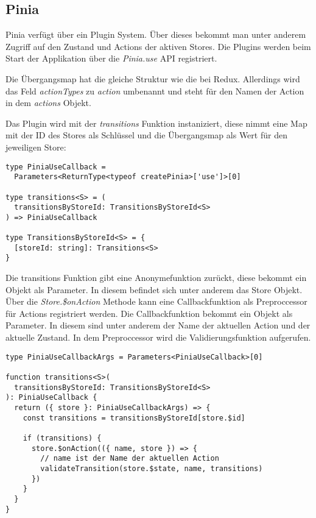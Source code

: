 \subsection{Pinia}

Pinia verfügt über ein Plugin System. Über dieses bekommt man unter anderem Zugriff auf den Zustand und Actions der aktiven Stores. Die Plugins werden beim Start der Applikation über die \textit{Pinia.use} API registriert.

Die Übergangsmap hat die gleiche Struktur wie die bei Redux. Allerdings wird das Feld \textit{actionTypes} zu \textit{action} umbenannt und steht für den Namen der Action in dem \textit{actions} Objekt. 

Das Plugin wird mit der \textit{transitions} Funktion instaniziert, diese nimmt eine Map mit der ID des Stores als Schlüssel und die Übergangsmap als Wert für den jeweiligen Store:

\begin{lstlisting}
type PiniaUseCallback =
  Parameters<ReturnType<typeof createPinia>['use']>[0]

type transitions<S> = (
  transitionsByStoreId: TransitionsByStoreId<S>
) => PiniaUseCallback

type TransitionsByStoreId<S> = {
  [storeId: string]: Transitions<S>
}
\end{lstlisting}

Die transitions Funktion gibt eine Anonymefunktion zurückt, diese bekommt ein Objekt als Parameter. In diesem befindet sich unter anderem das Store Objekt. Über die \textit{Store.\$onAction} Methode kann eine Callbackfunktion als Preproccessor für Actions registriert werden. Die Callbackfunktion bekommt ein Objekt als Parameter. In diesem sind unter anderem der Name der aktuellen Action und der aktuelle Zustand. In dem Preproccessor wird die Validierungsfunktion aufgerufen.

\begin{lstlisting}  
type PiniaUseCallbackArgs = Parameters<PiniaUseCallback>[0]

function transitions<S>(
  transitionsByStoreId: TransitionsByStoreId<S>
): PiniaUseCallback {
  return ({ store }: PiniaUseCallbackArgs) => {
    const transitions = transitionsByStoreId[store.$id]
  
    if (transitions) {
      store.$onAction(({ name, store }) => {
        // name ist der Name der aktuellen Action
        validateTransition(store.$state, name, transitions)
      })
    }
  }
}  
\end{lstlisting}

